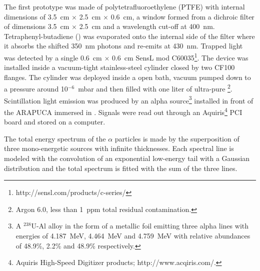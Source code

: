 The first prototype was made of polytetrafluoroethylene (PTFE) with internal dimensions of \SI{3.5}{cm} $\times$ \SI{2.5}{cm} $\times$ \SI{0.6}{cm}, a window formed from a dichroic filter of  dimensions \SI{3.5}{cm} $\times$ \SI{2.5}{cm} and a wavelength cut-off at \SI{400}{nm}. 
Tetraphenyl-butadiene () was evaporated onto the internal side of the filter where it absorbs the shifted \SI{350}{nm} photons and re-emits at \SI{430}{nm}. Trapped light was detected by a single \SI{0.6}{cm} $\times$ \SI{0.6}{cm} SensL  mod C60035\footnote{http://sensl.com/products/c-series/}.
The device was installed inside a vacuum-tight stainless-steel cylinder closed by two CF100 flanges. The cylinder was deployed inside a \lar open bath, vacuum pumped down to a pressure around  10$^{-6}$~\si{mbar} and then filled with one liter of ultra-pure \lar\footnote{Argon 6.0, less than \SI{1}{ppm} total residual contamination.}. 
Scintillation light emission was produced by an alpha source\footnote{A $^{238}$U-Al alloy in the form of a metallic foil emitting three alpha lines with energies of  \SI{4.187}{MeV}, \SI{4.464}{MeV} and  \SI{4.759}{MeV} with relative abundances of 48.9\%, 2.2\% and 48.9\% respectively.} installed in front of the ARAPUCA immersed in \lar. Signals were read out through an Aquiris\footnote{Aquiris High-Speed Digitizer products; http://www.acqiris.com/.} PCI board and stored on a computer.


The total energy spectrum of the $\alpha$ particles is made by the superposition of three mono-energetic sources with infinite thicknesses. Each spectral line is modeled with the convolution of an exponential low-energy tail with a Gaussian distribution and the total spectrum is fitted with the sum of the three lines.

